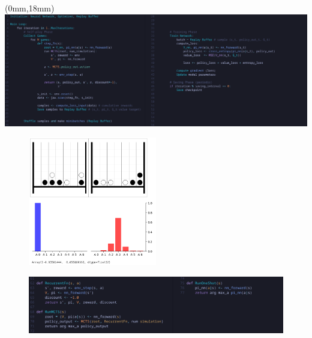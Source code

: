 \documentclass[aspectratio=169,xcolor=dvipsnames]{beamer}
\begin{document}
\begin{frame}{}
    \begin{textblock*}{\paperwidth}(0mm,18mm) %
        \includegraphics[width=\paperwidth,height=\paperheight,keepaspectratio]{alphazero_algo.png}
    \end{textblock*}
\end{frame}

\begin{frame}{}
\begin{figure}[h]
    \centering
    \includegraphics[width=0.5\textwidth]{network_forward.png}
    \label{fig:intro}
\end{figure}
\end{frame}

\begin{frame}{}
\begin{figure}[h]
    \centering
    \includegraphics[width=1\textwidth]{inference.png}
    \label{fig:intro}
\end{figure}
\end{frame}
\end{document}
